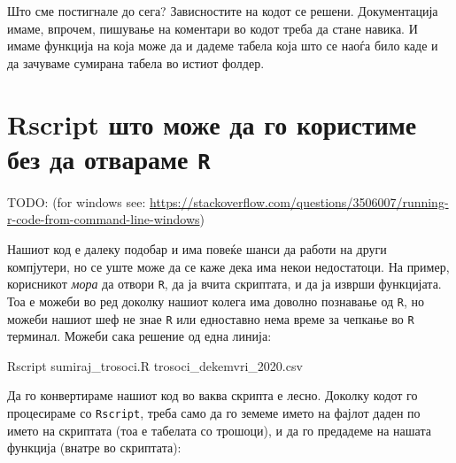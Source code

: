 \documentclass[
]{book}
\newenvironment{Shaded}{\begin{snugshade}}{\end{snugshade}}
\newcommand{\ExtensionTok}[1]{#1}
\newcommand{\NormalTok}[1]{#1}
\begin{document}
Што сме постигнале до сега? Зависностите на кодот се решени. Документација имаме, впрочем, пишување на коментари во кодот треба да стане навика. И имаме функција на која може да и дадеме табела која што се наоѓа било каде и да зачуваме сумирана табела во истиот фолдер.

\hypertarget{rscript-ux448ux442ux43e-ux43cux43eux436ux435-ux434ux430-ux433ux43e-ux43aux43eux440ux438ux441ux442ux438ux43cux435-ux431ux435ux437-ux434ux430-ux43eux442ux432ux430ux440ux430ux43cux435-r}{%
\section{\texorpdfstring{Rscript што може да го користиме без да отвараме \texttt{R}}{Rscript што може да го користиме без да отвараме R}}\label{rscript-ux448ux442ux43e-ux43cux43eux436ux435-ux434ux430-ux433ux43e-ux43aux43eux440ux438ux441ux442ux438ux43cux435-ux431ux435ux437-ux434ux430-ux43eux442ux432ux430ux440ux430ux43cux435-r}}

TODO:
(for windows see: \url{https://stackoverflow.com/questions/3506007/running-r-code-from-command-line-windows})

Нашиот код е далеку подобар и има повеќе шанси да работи на други компјутери, но се уште може да се каже дека има некои недостатоци. На пример, корисникот \emph{мора} да отвори \texttt{R}, да ја вчита скриптата, и да ја изврши функцијата. Тоа е можеби во ред доколку нашиот колега има доволно познавање од \texttt{R}, но можеби нашиот шеф не знае \texttt{R} или едноставно нема време за чепкање во \texttt{R} терминал. Можеби сака решение од една линија:

\begin{Shaded}
\begin{Highlighting}[]
\ExtensionTok{Rscript}\NormalTok{ sumiraj\_trosoci.R trosoci\_dekemvri\_2020.csv}
\end{Highlighting}
\end{Shaded}

Да го конвертираме нашиот код во ваква скрипта е лесно. Доколку кодот го процесираме со \texttt{Rscript}, треба само да го земеме името на фајлот даден по името на скриптата (тоа е табелата со трошоци), и да го предадеме на нашата функција (внатре во скриптата):
\end{document}
